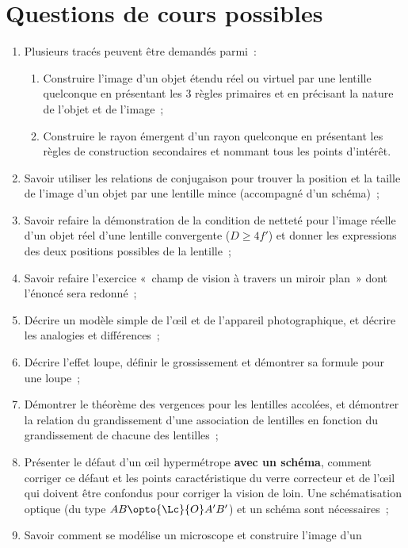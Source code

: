 \documentclass[a4paper, 12pt, final, garamond]{book}
\begin{document}
\section{Questions de cours possibles}
\begin{enumerate}
    \item Plusieurs tracés peuvent être demandés parmi~:
        \begin{enumerate}
            \item Construire l'image d'un objet étendu réel ou virtuel par une
                lentille quelconque en présentant les 3 règles primaires et en
                précisant la nature de l'objet et de l'image~;
            \item Construire le rayon émergent d'un rayon quelconque en
                présentant les règles de construction secondaires et nommant
                tous les points d'intérêt.
        \end{enumerate}
    \item Savoir utiliser les relations de conjugaison pour trouver la position
        et la taille de l'image d'un objet par une lentille mince (accompagné
        d'un schéma)~;
    \item Savoir refaire la démonstration de la condition de netteté pour
        l'image réelle d'un objet réel d'une lentille convergente ($D \geq 4f'$)
        et donner les expressions des deux positions possibles de la lentille~;
    \item Savoir refaire l'exercice «~champ de vision à travers un miroir plan~»
        dont l'énoncé sera redonné~;
    \item Décrire un modèle simple de l'œil et de l'appareil photographique, et
        décrire les analogies et différences~;
    \item Décrire l'effet loupe, définir le grossissement et démontrer sa
        formule pour une loupe~;
    \item Démontrer le théorème des vergences pour les lentilles accolées, et
        démontrer la relation du grandissement d'une association de lentilles en
        fonction du grandissement de chacune des lentilles~;
    \item Présenter le défaut d'un œil hypermétrope \textbf{avec un schéma},
        comment corriger ce défaut et les points caractéristique du verre
        correcteur et de l'œil qui doivent être confondus pour corriger la
        vision de loin. Une schématisation optique (du type $AB \opto{\Lc}{O}
        A'B'$) et un schéma sont nécessaires~;
    \item Savoir comment se modélise un microscope et construire l'image d'un

\end{enumerate}
\end{document}
